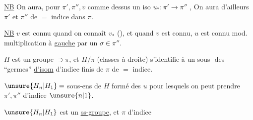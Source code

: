 \uline{NB} On aura, pour $\pi',\pi'',v$ comme dessus un iso
$u_*:\pi'\longrightarrow\pi''$ ,
On aura d'ailleurs $\pi'$ et $\pi''$ de $=$ indice dans $\pi$.

\uline{NB} $v$ est connu quand on connaît $v_*$ (\uline{}), et quand $v$ est connu, $u$ est connu  mod. multiplication à \uline{gauche} par un $\sigma\in\pi''$.


$H$ est un groupe $\supset\pi$, et $H/\pi$ (classes à droite) s'identifie à un sous- des ``germes'' \uline{d'isom}   d'indice finis de $\pi$ de $=$ indice.

$\unsure{H_n|H_1}=$ sous-ens de $H$ formé des $u$ pour lesquels on peut prendre $\pi',\pi''$ d'indice $\unsure{n|1}$.

$\unsure{H_n|H_1}$ est un \uline{ss-groupe}, et $\pi$ d'indice

